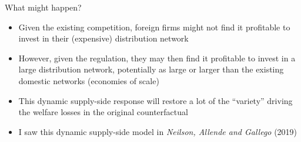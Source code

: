 \documentclass{beamer}
\begin{document}
%
\begin{frame}{What might happen?}
  \begin{itemize}
  \item Given the existing competition, foreign firms might not find it profitable to invest in their (expensive) distribution network
    \vfill
  \item However, given the regulation, they may then find it profitable to invest in a large distribution network, potentially as large or larger than the existing domestic networks (economies of scale)
    \vfill
  \item This dynamic supply-side response will restore a lot of the ``variety'' driving the welfare losses in the original counterfactual
    \vfill
    \item I saw this dynamic supply-side model in \emph{Neilson, Allende and Gallego} (2019)
  \end{itemize}
\end{frame}
\end{document}

